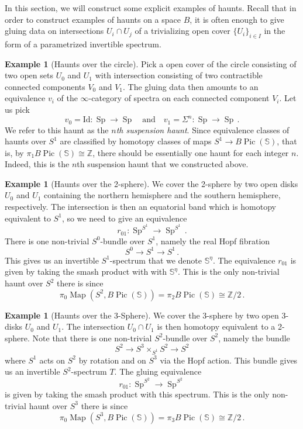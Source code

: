 \documentclass[10pt]{amsart}
\newcommand{\longto}{\longrightarrow}
\theoremstyle{plain}
\theoremstyle{definition}
\newtheorem{example}[theorem]{Example}
\DeclareMathOperator{\Sp}{Sp}
\DeclareMathOperator{\Pic}{Pic}
\DeclareMathOperator{\Map}{Map}
\newcommand{\bS}{\mathbb{S}}
\newcommand{\bZ}{\mathbb{Z}}
\newcommand{\och}{\quad \text{and} \quad}
\begin{document}
In this section, we will construct some explicit examples of haunts.
Recall that in order to construct examples of haunts on a space $B$, it is often enough to give gluing data on intersections $U_i \cap U_j$ of a trivializing open cover $\{U_i\}_{i \in I}$ in the form of a parametrized invertible spectrum.

\begin{example}[Haunts over the circle]
  Pick a open cover of the circle consisting of two open sets $U_0$ and $U_1$ with intersection consisting of two contractible connected components $V_0$ and $V_1$.
  The gluing data then amounts to an equivalence $v_i$ of the $\infty$-category of spectra on each connected component $V_i$.
  Let us pick
  \[
  v_0 = \mathrm{Id} : \Sp \longto \Sp \och v_1 = \Sigma^n : \Sp \longto \Sp \,.
  \]
  We refer to this haunt as the \emph{$n$th suspension haunt}.
  Since equivalence classes of haunts over $S^1$ are classified by homotopy classes of maps $S^1 \to B\Pic(\bS)$, that is, by $\pi_1 B\Pic(\bS) \cong \bZ$, there should be essentially one haunt for each integer $n$.
  Indeed, this is the $n$th suspension haunt that we constructed above.
\end{example}

\begin{example}[Haunts over the 2-sphere]
 We cover the 2-sphere by two open disks $U_0$ and $U_1$ containing the northern hemisphere and the southern hemisphere, respectively. The intersection is then an equatorial band which is homotopy equivalent to $S^1$, so we need to give an equivalence
 \[
 r_{01} : \Sp^{S^1} \longto \Sp^{S^1} \,.
 \]
 There is one non-trivial $S^0$-bundle over $S^1$, namely the real Hopf fibration
 \[
 S^0 \longto S^1 \longto S^1 \,.
 \]
 This gives us an invertible $S^1$-spectrum that we denote $\bS^\eta$.
 The equivalence $r_{01}$ is given by taking the smash product with with $\bS^\eta$.
 This is the only non-trivial haunt over $S^2$ there is since
 \[
 \pi_0 \Map(S^2,B\Pic(\bS)) = \pi_2 B\Pic(\bS) \cong \bZ/2 \,.
 \]
\end{example}

\begin{example}[Haunts over the 3-Sphere]
 We cover the 3-sphere by two open 3-disks $U_0$ and $U_1$.
 The intersection $U_0 \cap U_1$ is then homotopy equivalent to a 2-sphere.
 Note that there is one non-trivial $S^2$-bundle over $S^2$, namely the bundle
 \[
 S^2 \longto S^3 \times_{S^1} S^2 \longto S^2
 \]
 where $S^1$ acts on $S^2$ by rotation and on $S^3$ via the Hopf action.
 This bundle gives us an invertible $S^2$-spectrum $T$.
 The gluing equivalence
 \[
 r_{01} : \Sp^{S^2} \longto \Sp^{S^2}
 \]
 is given by taking the smash product with this spectrum.
 This is the only non-trivial haunt over $S^3$ there is since
 \[
 \pi_0 \Map(S^3,B\Pic(\bS)) = \pi_3 B\Pic(\bS) \cong \bZ/2 \,.
 \]
\end{example}
\end{document}
